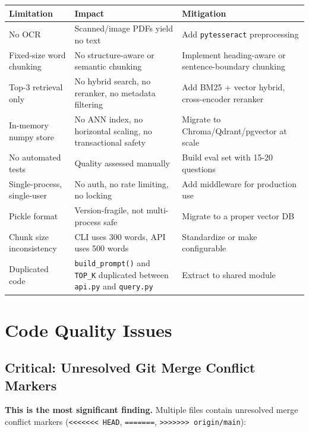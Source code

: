 \documentclass[11pt,a4paper]{paper}
\begin{document}
\begin{longtable}{>{\raggedright}p{3.5cm} >{\raggedright}p{5.0cm} >{\raggedright\arraybackslash}p{6.0cm}}
\toprule
\textbf{Limitation} & \textbf{Impact} & \textbf{Mitigation} \\
\midrule
\endhead
No OCR & Scanned/image PDFs yield no text & Add \texttt{pytesseract} preprocessing \\
Fixed-size word chunking & No structure-aware or semantic chunking & Implement heading-aware or sentence-boundary chunking \\
Top-3 retrieval only & No hybrid search, no reranker, no metadata filtering & Add BM25 + vector hybrid, cross-encoder reranker \\
In-memory numpy store & No ANN index, no horizontal scaling, no transactional safety & Migrate to Chroma/Qdrant/pgvector at scale \\
No automated tests & Quality assessed manually & Build eval set with 15-20 questions \\
Single-process, single-user & No auth, no rate limiting, no locking & Add middleware for production use \\
Pickle format & Version-fragile, not multi-process safe & Migrate to a proper vector DB \\
Chunk size inconsistency & CLI uses 300 words, API uses 500 words & Standardize or make configurable \\
Duplicated code & \texttt{build\_prompt()} and \texttt{TOP\_K} duplicated between \texttt{api.py} and \texttt{query.py} & Extract to shared module \\
\bottomrule
\end{longtable}
\label{tab:limitations}

\section{Code Quality Issues}
\label{sec:code-quality}

\subsection{Critical: Unresolved Git Merge Conflict Markers}

\textbf{This is the most significant finding.} Multiple files contain unresolved merge conflict markers (\texttt{<<<<<<< HEAD}, \texttt{=======}, \texttt{>>>>>>> origin/main}):
\end{document}
